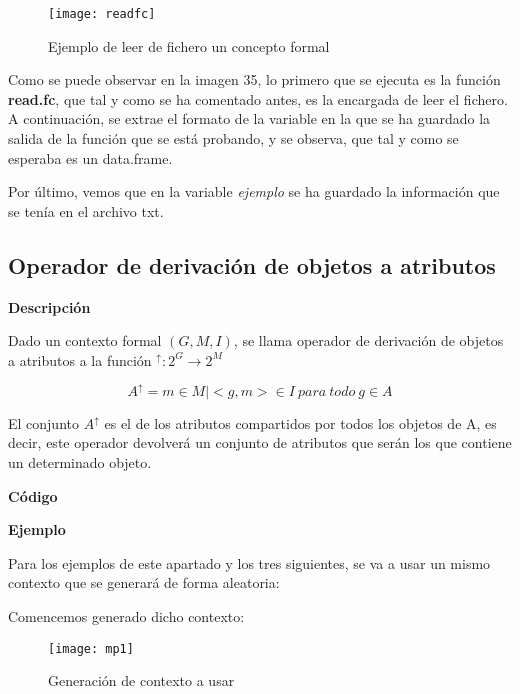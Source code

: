         \begin{figure}[H]
            \centering
            \texttt{[image: readfc]}
            \caption{Ejemplo de leer de fichero un concepto formal}
            \label{fig:readfc}
        \end{figure}

        Como se puede observar en la imagen 35, lo primero que se ejecuta es la funci\'on \textbf{read.fc}, que tal y como se ha comentado 
        antes, es la encargada de leer el fichero. A continuaci\'on, se extrae el formato de la variable en la que se ha guardado la 
        salida de la funci\'on que se est\'a probando, y se observa, que tal y como se esperaba es un data.frame.

        Por \'ultimo, vemos que en la variable \textit{ejemplo} se ha guardado la informaci\'on que se ten\'ia en el archivo txt.

    \subsection{Operador de derivaci\'on de objetos a atributos}

        \textbf{Descripci\'on}

        Dado un contexto formal \( (G, M, I) \), se llama operador de derivaci\'on de objetos a atributos a la 
        funci\'on \( ^\uparrow : 2^G \rightarrow 2^M \)

        \[ A^\uparrow = { m \in M | <g,m> \in I ~ para ~ todo ~ g \in A } \]

        El conjunto \( A^\uparrow \) es el de los atributos compartidos por todos los objetos de A, es decir, este operador devolver\'a 
        un conjunto de atributos que ser\'an los que contiene un determinado objeto.
        
        \bigskip


        \textbf{C\'odigo}

        

        \textbf{Ejemplo}

        Para los ejemplos de este apartado y los tres siguientes, se va a usar un mismo contexto que se generar\'a de forma aleatoria:

        Comencemos generado dicho contexto:

        \begin{figure}[H]
            \centering
            \texttt{[image: mp1]}
            \caption{Generaci\'on de contexto a usar}
            \label{fig:mp1}
        \end{figure}


